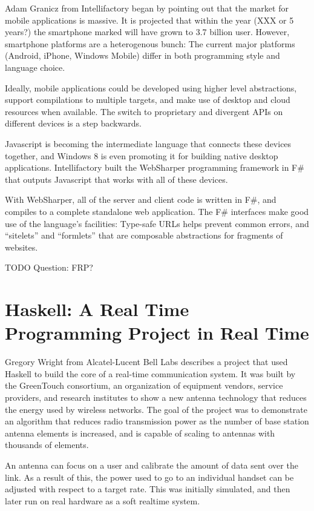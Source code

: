 \documentclass{jfp1}
\begin{document}
Adam Granicz from Intellifactory began by pointing out that the market
for mobile applications is massive.  It is projected that within the
year (XXX or 5 years?)  the smartphone marked will have grown to 3.7
billion user.  However, smartphone platforms are a heterogenous bunch:
The current major platforms (Android, iPhone, Windows Mobile) differ in
both programming style and language choice.

Ideally, mobile applications could be developed using higher level
abstractions, support compilations to multiple targets, and make use of
desktop and cloud resources when available. The switch to proprietary
and divergent APIs on different devices is a step backwards.

Javascript is becoming the intermediate language that connects these
devices together, and Windows 8 is even promoting it for building native
desktop applications. Intellifactory built the WebSharper programming
framework in F\# that outputs Javascript that works with all of these
devices.

With WebSharper, all of the server and client code is written in F\#,
and compiles to a complete standalone web application. The F\#
interfaces make good use of the language's facilities: Type-safe URLs
helps prevent common errors, and ``sitelets'' and ``formlets'' that are
composable abstractions for fragments of websites.

TODO Question: FRP?

\section{Haskell: A Real Time Programming Project in Real Time}

Gregory Wright from Alcatel-Lucent Bell Labs describes a project that
used Haskell to build the core of a real-time communication system.  It
was built by the GreenTouch consortium, an organization of equipment
vendors, service providers, and research institutes to show a new
antenna technology that reduces the energy used by wireless networks.
The goal of the project was to demonstrate an algorithm that reduces
radio transmission power as the number of base station antenna elements
is increased, and is capable of scaling to antennas with thousands of
elements.

An antenna can focus on a user and calibrate the amount of data sent
over the link. As a result of this, the power used to go to an
individual handset can be adjusted with respect to a target rate.  This
was initially simulated, and then later run on real hardware as a soft
realtime system.
\end{document}
